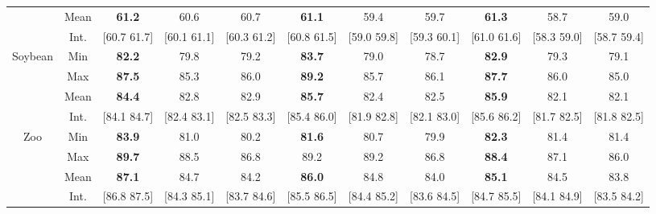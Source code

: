 \documentclass[10pt]{article}
\begin{document}
\begin{table*}
{\begin{tabular}{|c|c|ccc|ccc|ccc|}
\\
&Mean
 &{\bfseries 61.2} &60.6 &60.7  %
 &{\bfseries 61.1} &59.4 &59.7  %
 &{\bfseries 61.3} &58.7 &59.0  %
\\
&Int.
 &[60.7 61.7] &[60.1 61.1] &[60.3 61.2]  %
 &[60.8 61.5] &[59.0 59.8] &[59.3 60.1]  %
 &[61.0 61.6] &[58.3 59.0] &[58.7 59.4]  %
\\
\cline{1-11}
\multirow{4}{1.6cm}{Soybean}
&Min
 &{\bfseries 82.2} &79.8 &79.2  %
 &{\bfseries 83.7} &79.0 &78.7  %
 &{\bfseries 82.9} &79.3 &79.1  %
\\
&Max
 &{\bfseries 87.5} &85.3 &86.0  %
 &{\bfseries 89.2} &85.7 &86.1  %
 &{\bfseries 87.7} &86.0 &85.0  %
\\
&Mean
 &{\bfseries 84.4} &82.8 &82.9  %
 &{\bfseries 85.7} &82.4 &82.5  %
 &{\bfseries 85.9} &82.1 &82.1  %
\\
&Int.
 &[84.1 84.7] &[82.4 83.1] &[82.5 83.3]  %
 &[85.4 86.0] &[81.9 82.8] &[82.1 83.0]  %
 &[85.6 86.2] &[81.7 82.5] &[81.8 82.5]  %
\\
\cline{1-11}
\multirow{4}{1.6cm}{Zoo}
&Min
 &{\bfseries 83.9} &81.0 &80.2  %
 &{\bfseries 81.6} &80.7 &79.9  %
 &{\bfseries 82.3} &81.4 &81.4  %
\\
&Max
 &{\bfseries 89.7} &88.5 &86.8  %
 &89.2 &89.2 &86.8  %
 &{\bfseries 88.4} &87.1 &86.0  %
\\
&Mean
 &{\bfseries 87.1} &84.7 &84.2  %
 &{\bfseries 86.0} &84.8 &84.0  %
 &{\bfseries 85.1} &84.5 &83.8  %
\\
&Int.
 &[86.8 87.5] &[84.3 85.1] &[83.7 84.6]  %
 &[85.5 86.5] &[84.4 85.2] &[83.6 84.5]  %
 &[84.7 85.5] &[84.1 84.9] &[83.5 84.2]  %
\\
\cline{1-11}
\hline
\end{tabular}}
\end{table*}
\end{document}
